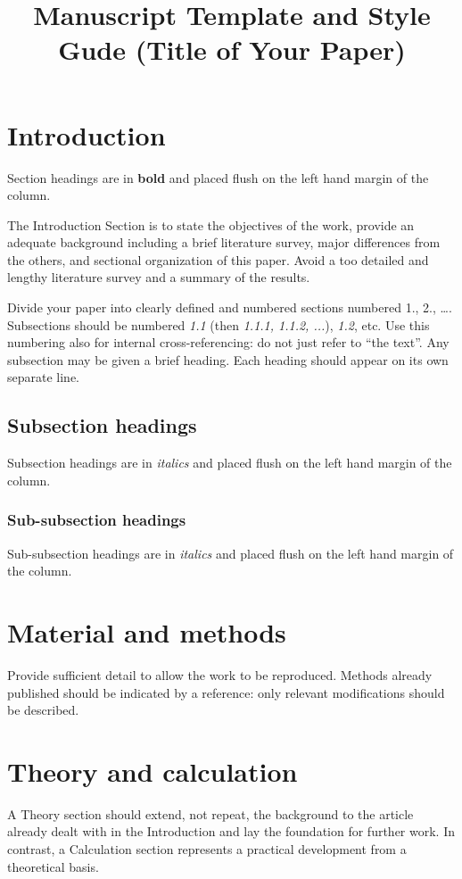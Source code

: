 \documentclass[]{iac}
\title{Manuscript Template and Style Gude (Title of Your Paper)}
\begin{document}
\maketitle

\section{Introduction}
Section headings are in \textbf{bold} and placed flush on the left hand margin of the column.

The Introduction Section is to state the objectives of the work, provide an adequate background including a brief literature survey, major differences from the others, and sectional organization of this paper. Avoid a too detailed and lengthy literature survey and a summary of the results.

Divide your paper into clearly defined and numbered sections numbered 1., 2., …. Subsections should be numbered \textit{1.1} (then \textit{1.1.1, 1.1.2, ...}), \textit{1.2}, etc. Use this numbering also for internal cross-referencing: do not just refer to “the text”. Any subsection may be given a brief heading. Each heading should appear on its own separate line. 

\subsection{Subsection headings}
Subsection headings are in \textit{italics} and placed flush on the left hand margin of the column.

\subsubsection{Sub-subsection headings}
Sub-subsection headings are in \textit{italics} and placed flush on the left hand margin of the column.

\section{Material and methods}
Provide sufficient detail to allow the work to be reproduced. Methods already published should be indicated by a reference: only relevant modifications should be described.

\section{Theory and calculation}
A Theory section should extend, not repeat, the background to the article already dealt with in the Introduction and lay the foundation for further work. In contrast, a Calculation section represents a practical development from a theoretical basis.
\end{document}
